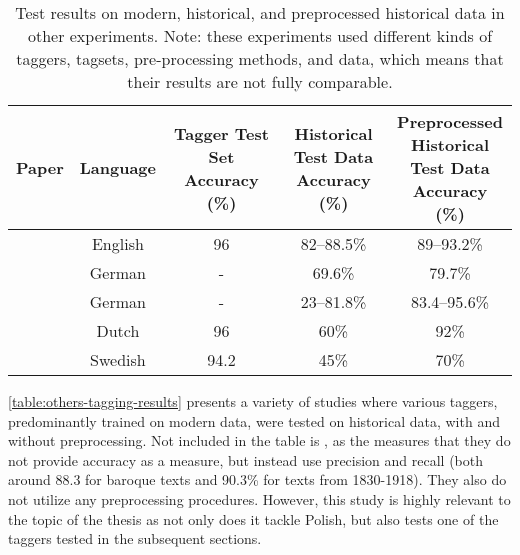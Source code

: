 \begin{table*}[h]
\begin{center}
\begin{tabular}{|l|cccc|}
\hline \bf Paper & \bf Language & \bf \makecell[c]{Tagger Test Set \\ Accuracy (\%)} & \bf \makecell[c]{Historical \\ Test Data \\ Accuracy (\%)} & \bf \makecell[c]{Preprocessed \\ Historical \\ Test Data \\ Accuracy (\%)} \\ \hline
\citet{rayson07} & English & 96 & 82--88.5\% & 89--93.2\% \\
\citet{scheible11} & German & - & 69.6\% & 79.7\% \\
\citet{bollmann-2013-pos} & German & - & 23--81.8\% & 83.4--95.6\% \\
\citet{hupkes16} & Dutch & 96 & 60\% & 92\% \\
\citet{adesam-bouma-2016-old} & Swedish & 94.2\footnotemark & 45\% & 70\% \\
\hline
\end{tabular}
\end{center}
\caption{\label{table:others-tagging-results} Test results on modern, historical, and preprocessed historical data in other experiments. Note: these experiments used different kinds of taggers, tagsets, pre-processing methods, and data, which means that their results are not fully comparable.}
\end{table*}

\autoref{table:others-tagging-results} presents a variety of studies where various taggers, predominantly trained on modern data, were tested on historical data, with and without preprocessing. Not included in the table is \citet{waszczuk2018morphosyntactic}, as the measures that they do not provide accuracy as a measure, but instead use precision and recall (both around 88.3 for baroque texts and 90.3\% for texts from 1830-1918). They also do not utilize any preprocessing procedures. However, this study is highly relevant to the topic of the thesis as not only does it tackle Polish, but also tests one of the taggers tested in the subsequent sections. 

